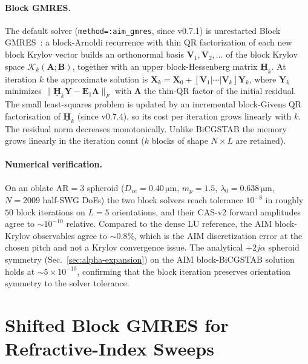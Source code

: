 \documentclass[11pt,a4paper]{article}
\begin{document}
\paragraph{Block GMRES.}
The default solver (\texttt{method=:aim\_gmres}, since v0.7.1) is
unrestarted Block GMRES~\cite{SimoncSzyld1996}: a
block-Arnoldi recurrence with thin QR factorization of each new block
Krylov vector builds an orthonormal basis
$\mathbf{V}_1,\mathbf{V}_2,\ldots$ of the block Krylov space
$\mathcal{K}_k(\mathbf{A};\mathbf{B})$, together with an upper
block-Hessenberg matrix $\underline{\mathbf{H}}_k$. At iteration $k$
the approximate solution is
$\mathbf{X}_k = \mathbf{X}_0
+ [\mathbf{V}_1|\cdots|\mathbf{V}_k]\mathbf{Y}_k$,
where $\mathbf{Y}_k$ minimizes
$\|\underline{\mathbf{H}}_k\mathbf{Y} - \mathbf{E}_1\boldsymbol{\Lambda}\|_F$
with $\boldsymbol{\Lambda}$ the thin-QR factor of the initial
residual. The small least-squares problem is updated by an incremental
block-Givens QR factorisation of $\underline{\mathbf{H}}_k$ (since
v0.7.4), so its cost per iteration grows linearly with $k$. The residual
norm decreases monotonically. Unlike BiCGSTAB the memory grows linearly
in the iteration count ($k$ blocks of shape $N\times L$ are
retained).

\paragraph{Numerical verification.}
On an oblate AR$=3$ spheroid
($D_{ve} = 0.40\,\si{\micro\meter}$, $m_p=1.5$,
$\lambda_0=0.638\,\si{\micro\meter}$, $N=2009$ half-SWG DoFs) the two
block solvers reach tolerance $10^{-8}$ in roughly $50$ block
iterations on $L=5$ orientations, and their CAS-v2 forward amplitudes
agree to $\sim 10^{-10}$ relative. Compared to the dense LU
reference, the AIM block-Krylov observables agree to $\sim 0.8\%$,
which is the AIM discretization error at the chosen pitch and not a
Krylov convergence issue. The analytical $+2j\alpha$ spheroid symmetry
(Sec.~\ref{sec:alpha-expansion}) on the AIM block-BiCGSTAB solution holds at
$\sim 5\times 10^{-10}$, confirming that the block iteration preserves
orientation symmetry to the solver tolerance.

\section{Shifted Block GMRES for Refractive-Index Sweeps}
\label{sec:shifted-gmres}
\end{document}
